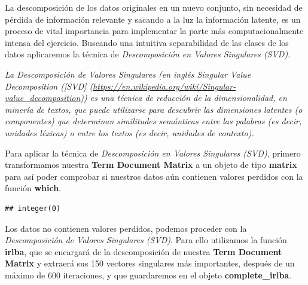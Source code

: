 \documentclass[]{article}
\newenvironment{Shaded}{\begin{snugshade}}{\end{snugshade}}
\newcommand{\DataTypeTok}[1]{\textcolor[rgb]{0.13,0.29,0.53}{#1}}
\newcommand{\DecValTok}[1]{\textcolor[rgb]{0.00,0.00,0.81}{#1}}
\newcommand{\KeywordTok}[1]{\textcolor[rgb]{0.13,0.29,0.53}{\textbf{#1}}}
\newcommand{\NormalTok}[1]{#1}
\newcommand{\OperatorTok}[1]{\textcolor[rgb]{0.81,0.36,0.00}{\textbf{#1}}}
\newcommand{\StringTok}[1]{\textcolor[rgb]{0.31,0.60,0.02}{#1}}
\begin{document}
La descomposición de los datos originales en un nuevo conjunto, sin
necesidad de pérdida de información relevante y sacando a la luz la
información latente, es un proceso de vital importancia para implementar
la parte más computacionalmente intensa del ejercicio. Buscando una
intuitiva separabilidad de las clases de los datos aplicaremos la
técnica de \emph{Descomposición en Valores Singulares (SVD)}.

\emph{La Descomposición de Valores Singulares (en inglés Singular Value
Decomposition ({[}SVD{]}
(\url{https://en.wikipedia.org/wiki/Singular-value_decomposition})) es
una técnica de reducción de la dimensionalidad, en minería de textos,
que puede utilizarse para descubrir las dimensiones latentes (o
componentes) que determinan similitudes semánticas entre las palabras
(es decir, unidades léxicas) o entre los textos (es decir, unidades de
contexto).}

Para aplicar la técnica de \emph{Descomposición en Valores Singulares
(SVD)}, primero transformamos nuestra \textbf{Term Document Matrix} a un
objeto de tipo \textbf{matrix} para así poder comprobar si nuestros
datos aún contienen valores perdidos con la función \textbf{which}.

\begin{verbatim}
## integer(0)
\end{verbatim}

Los datos no contienen valores perdidos, podemos proceder con la
\emph{Descomposición de Valores Singulares (SVD)}. Para ello utilizamos
la función \textbf{irlba}, que se encargará de la descomposición de
nuestra \textbf{Term Document Matrix} y extraerá sus 150 vectores
singulares más importantes, después de un máximo de 600 iteraciones, y
que guardaremos en el objeto \textbf{complete\_irlba}.

\begin{Shaded}
\end{Shaded}
\end{document}
